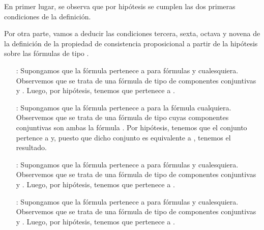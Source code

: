 \begin{isabellebody}
\begin{isamarkuptext}
\begin{demostracion}
  En primer lugar, se observa que por hipótesis se cumplen las dos primeras condiciones de
  la definición.

  Por otra parte, vamos a deducir las condiciones tercera, sexta, octava y novena de la
  definición de la propiedad de consistencia proposicional a partir de la hipótesis sobre las 
  fórmulas de tipo \isa{{\isasymalpha}}.
  \begin{enumerate}
    \item[\isa{{\isadigit{3}}{\isacharparenright}}:] Supongamos que la fórmula  pertenece a  para fórmulas  y 
    cualesquiera. Observemos que se trata de una fórmula de tipo \isa{{\isasymalpha}} de componentes conjuntivas
     y . Luego, por hipótesis, tenemos que  pertenece a .
    \item[\isa{{\isadigit{6}}{\isacharparenright}}:] Supongamos que la fórmula  pertenece a  para la fórmula  
    cualquiera. Observemos que se trata de una fórmula de tipo \isa{{\isasymalpha}} cuyas componentes conjuntivas 
    son ambas la fórmula . Por hipótesis, tenemos que el conjunto  pertence a 
    y, puesto que dicho conjunto es equivalente a , tenemos el resultado.
    \item[\isa{{\isadigit{8}}{\isacharparenright}}:] Supongamos que la fórmula  pertenece a  para fórmulas  y 
    cualesquiera. Observemos que se trata de una fórmula de tipo \isa{{\isasymalpha}} de componentes conjuntivas
     y . Luego, por hipótesis, tenemos que  pertenece a .
    \item[\isa{{\isadigit{9}}{\isacharparenright}}:] Supongamos que la fórmula  pertenece a  para fórmulas  y 
    cualesquiera. Observemos que se trata de una fórmula de tipo \isa{{\isasymalpha}} de componentes conjuntivas
     y . Luego, por hipótesis, tenemos que  pertenece a .
  \end{enumerate} 


\end{demostracion}
\end{isamarkuptext}
\end{isabellebody}
